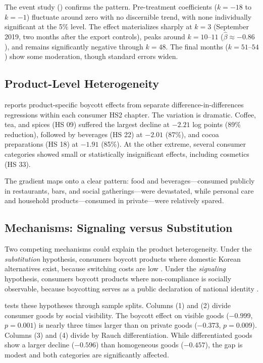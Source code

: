 \documentclass[12pt]{article}
\begin{document}


The event study () confirms the pattern. Pre-treatment coefficients ($k = -18$ to $k = -1$) fluctuate around zero with no discernible trend, with none individually significant at the 5\% level. The effect materializes sharply at $k = 3$ (September 2019, two months after the export controls), peaks around $k = 10$--$11$ ($\hat{\beta} \approx -0.86$), and remains significantly negative through $k = 48$. The final months ($k = 51$--$54$) show some moderation, though standard errors widen.

\subsection{Product-Level Heterogeneity}

 reports product-specific boycott effects from separate difference-in-differences regressions within each consumer HS2 chapter. The variation is dramatic. Coffee, tea, and spices (HS 09) suffered the largest decline at $-2.21$ log points (89\% reduction), followed by beverages (HS 22) at $-2.01$ (87\%), and cocoa preparations (HS 18) at $-1.91$ (85\%). At the other extreme, several consumer categories showed small or statistically insignificant effects, including cosmetics (HS 33).

The gradient maps onto a clear pattern: food and beverages---consumed publicly in restaurants, bars, and social gatherings---were devastated, while personal care and household products---consumed in private---were relatively spared.



\subsection{Mechanisms: Signaling versus Substitution}

Two competing mechanisms could explain the product heterogeneity. Under the \textit{substitution} hypothesis, consumers boycott products where domestic Korean alternatives exist, because switching costs are low \citep{rauch1999networks}. Under the \textit{signaling} hypothesis, consumers boycott products where non-compliance is socially observable, because boycotting serves as a public declaration of national identity \citep{dellavigna2017voting}.

 tests these hypotheses through sample splits. Columns (1) and (2) divide consumer goods by social visibility. The boycott effect on visible goods ($-0.999$, $p = 0.001$) is nearly three times larger than on private goods ($-0.373$, $p = 0.009$). Columns (3) and (4) divide by Rauch differentiation. While differentiated goods show a larger decline ($-0.596$) than homogeneous goods ($-0.457$), the gap is modest and both categories are significantly affected.
\end{document}
